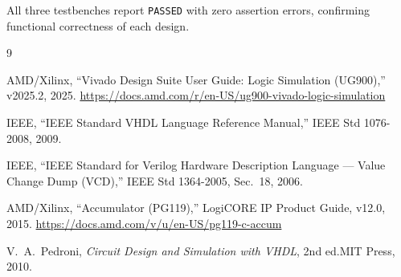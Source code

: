 \documentclass[12pt]{article}
\begin{document}
\noindent
All three testbenches report \texttt{PASSED} with zero assertion errors,
confirming functional correctness of each design.



\begin{thebibliography}{9}

AMD/Xilinx, ``Vivado Design Suite User Guide: Logic Simulation
(UG900),'' v2025.2, 2025.
\url{https://docs.amd.com/r/en-US/ug900-vivado-logic-simulation}

IEEE, ``IEEE Standard VHDL Language Reference Manual,'' IEEE Std
1076-2008, 2009.

IEEE, ``IEEE Standard for Verilog Hardware Description Language ---
Value Change Dump (VCD),'' IEEE Std 1364-2005, Sec.~18, 2006.

AMD/Xilinx, ``Accumulator (PG119),'' LogiCORE IP Product Guide, v12.0,
2015.
\url{https://docs.amd.com/v/u/en-US/pg119-c-accum}

V.~A.~Pedroni, \textit{Circuit Design and Simulation with VHDL}, 2nd
ed.\@ MIT Press, 2010.

\end{thebibliography}
\end{document}
